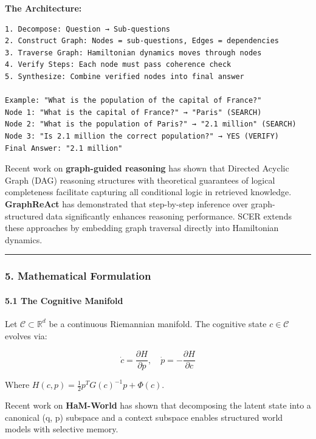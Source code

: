 \documentclass[
  11pt,
  a4paper,
]{article}
\begin{document}
\textbf{The Architecture:}

\begin{verbatim}
1. Decompose: Question → Sub-questions
2. Construct Graph: Nodes = sub-questions, Edges = dependencies
3. Traverse Graph: Hamiltonian dynamics moves through nodes
4. Verify Steps: Each node must pass coherence check
5. Synthesize: Combine verified nodes into final answer

Example: "What is the population of the capital of France?"
Node 1: "What is the capital of France?" → "Paris" (SEARCH)
Node 2: "What is the population of Paris?" → "2.1 million" (SEARCH)
Node 3: "Is 2.1 million the correct population?" → YES (VERIFY)
Final Answer: "2.1 million"
\end{verbatim}

Recent work on \textbf{graph-guided reasoning} has shown that Directed
Acyclic Graph (DAG) reasoning structures with theoretical guarantees of
logical completeness facilitate capturing all conditional logic in
retrieved knowledge. \textbf{GraphReAct} has demonstrated that
step-by-step inference over graph-structured data significantly enhances
reasoning performance. SCER extends these approaches by embedding graph
traversal directly into Hamiltonian dynamics.

\begin{center}\rule{0.5\linewidth}{0.5pt}\end{center}

\subsubsection{5. Mathematical
Formulation}\label{mathematical-formulation-5}

\paragraph{5.1 The Cognitive Manifold}\label{the-cognitive-manifold-2}

Let \(\mathcal{C} \subset \mathbb{R}^d\) be a continuous Riemannian
manifold. The cognitive state \(c \in \mathcal{C}\) evolves via:

\[
\dot{c} = \frac{\partial H}{\partial p}, \quad \dot{p} = -\frac{\partial H}{\partial c}
\]

Where \(H(c,p) = \frac{1}{2} p^T G(c)^{-1} p + \Phi(c)\).

Recent work on \textbf{HaM-World} has shown that decomposing the latent
state into a canonical (q, p) subspace and a context subspace enables
structured world models with selective memory.
\end{document}
